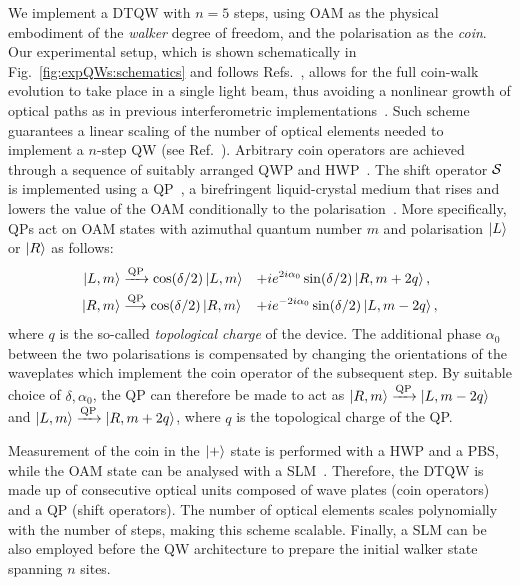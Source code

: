 We implement a \ac{DTQW} with $n=5$ steps, using \ac{OAM} as the physical embodiment of the \emph{walker} degree of freedom, and the polarisation as the \emph{coin}.
Our experimental setup, which is shown schematically in Fig.~\ref{fig:expQWs:schematics} and follows Refs.~\cite{cardano2015quantum,cardano2016statistical}, allows for the full coin-walk evolution to take place in a single light beam, thus avoiding a nonlinear growth of optical paths as in previous interferometric implementations~\cite{zhang2010implementation,goyal2013implementing,cardano2015quantum}. Such scheme guarantees a linear scaling of the number of optical elements needed to implement a $n$-step \ac{QW} (see Ref.~\cite{SI}). Arbitrary coin operators are achieved through a sequence of suitably arranged \ac{QWP} and \ac{HWP}~\cite{simon1990minimal}. The shift operator ${\mathcal{S}}$ is implemented using a \ac{QP}~\cite{marrucci2006optical}, a birefringent liquid-crystal medium that rises and lowers the value of the \ac{OAM} conditionally to the polarisation~\cite{marrucci2006optical}. More specifically, \acp{QP} act on \ac{OAM} states with azimuthal quantum number $m$ and polarisation $\ket L$ or $\ket R$ as follows:
\begin{equation}
\begin{aligned}
	\ket{L,m} & \xrightarrow{\text{QP}} \cos(\delta/2) \ket{L,m}
									&+& i e^{2 i \alpha_0} \sin(\delta/2) \ket{R,m+2q}, \\
	\ket{R,m} & \stackrel{\text{QP}}{\longrightarrow} \cos(\delta/2) \ket{R,m}
									&+& i e^{-2 i \alpha_0} \sin(\delta/2) \ket{L,m-2q},
\end{aligned}
\end{equation}
where $q$ is the so-called \emph{topological charge} of the device.
The additional phase $\alpha_0$ between the two polarisations is compensated by changing the orientations of the waveplates which implement the coin operator of the subsequent step.
By suitable choice of $\delta,\alpha_0$, the QP can therefore be made to act as
$\ket{R,m}\xrightarrow{\text{QP}} \ket{L,m-2q}$ and $\ket{L,m}\xrightarrow{\text{QP}}\ket{R,m+2q}$, where $q$ is the topological charge of the \ac{QP}.

Measurement of the coin in the $\ket+$ state is performed with a \ac{HWP} and a \ac{PBS}, while the \ac{OAM} state can be analysed with a \ac{SLM}~\cite{cardano2015quantum}.
Therefore, the \ac{DTQW} is made up of consecutive optical units composed of wave plates (coin operators) and a QP (shift operators).
The number of optical elements scales polynomially with the number of steps, making this scheme scalable.
Finally, a \ac{SLM} can be also employed before the \ac{QW} architecture to prepare the initial walker state spanning $n$ sites.


